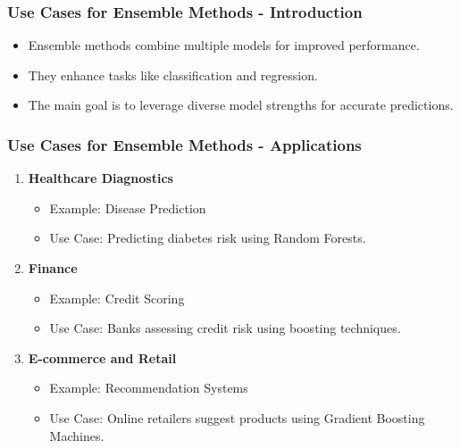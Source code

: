\documentclass[aspectratio=169]{beamer}
\begin{document}
\begin{frame}[fragile]
  \frametitle{Use Cases for Ensemble Methods - Introduction}
  \begin{itemize}
    \item Ensemble methods combine multiple models for improved performance.
    \item They enhance tasks like classification and regression.
    \item The main goal is to leverage diverse model strengths for accurate predictions.
  \end{itemize}
\end{frame}

\begin{frame}[fragile]
  \frametitle{Use Cases for Ensemble Methods - Applications}
  \begin{enumerate}
    \item \textbf{Healthcare Diagnostics}
      \begin{itemize}
        \item Example: Disease Prediction
        \item Use Case: Predicting diabetes risk using Random Forests.
      \end{itemize}
    \item \textbf{Finance}
      \begin{itemize}
        \item Example: Credit Scoring
        \item Use Case: Banks assessing credit risk using boosting techniques.
      \end{itemize}
    \item \textbf{E-commerce and Retail}
      \begin{itemize}
        \item Example: Recommendation Systems
        \item Use Case: Online retailers suggest products using Gradient Boosting Machines.
      \end{itemize}
  \end{enumerate}
\end{frame}
\end{document}

